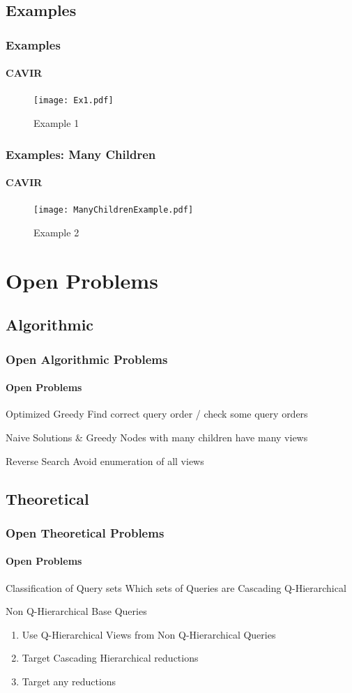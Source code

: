 \documentclass[
	11pt, %
]{beamer}
\begin{document}
\subsection{Examples}
\begin{frame}
	\frametitle{Examples}
	\framesubtitle{CAVIR}
	\begin{figure}
		\texttt{[image: Ex1.pdf]}
		\caption{Example 1}
	\end{figure}
\end{frame}

\begin{frame}
	\frametitle{Examples: Many Children}
	\framesubtitle{CAVIR}
	\begin{figure}
		\texttt{[image: ManyChildrenExample.pdf]}
		\caption{Example 2}
	\end{figure}
\end{frame}

\section{Open Problems}
\subsection{Algorithmic}
\begin{frame}
	\frametitle{Open Algorithmic Problems}
	\framesubtitle{Open Problems}
	\begin{block}{Optimized Greedy}
		Find correct query order / check some query orders
	\end{block}
	\begin{block}{Naive Solutions \& Greedy}
		Nodes with many children have many views
	\end{block}
	\begin{block}{Reverse Search}
		Avoid enumeration of all views
	\end{block}
\end{frame}
\subsection{Theoretical}

\begin{frame}
	\frametitle{Open Theoretical Problems}
	\framesubtitle{Open Problems}
	\begin{block}{Classification of Query sets}
		Which sets of Queries are Cascading Q-Hierarchical
	\end{block}

	\begin{block}{Non Q-Hierarchical Base Queries}
		\begin{enumerate}
			\item Use Q-Hierarchical Views from Non Q-Hierarchical Queries
			\item Target Cascading Hierarchical reductions
			\item Target any reductions
		\end{enumerate}
	\end{block}
\end{frame}
\end{document}
